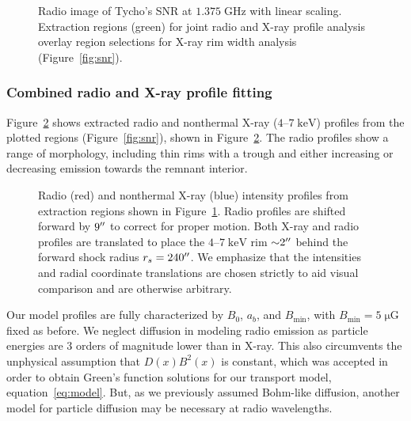 \documentclass[iop, apj, numberedappendix]{emulateapj}
\newcommand*{\mt}{\mathrm}
\newcommand*{\unit}[1]{\;\mt{#1}}  %
\newcommand*{\abt}{\mathord{\sim}} %
\newcommand*{\muG}{\unit{\mu G}}
\begin{document}
\begin{figure}
    \centering
    \caption{Radio image of Tycho's SNR at $1.375 \unit{GHz}$ with linear
    scaling.  Extraction regions (green) for joint radio and X-ray profile
    analysis overlay region selections for X-ray rim width analysis
    (Figure~\ref{fig:snr}). \label{fig:radio-snr}}
\end{figure}

\subsubsection{Combined radio and X-ray profile fitting}



Figure~\ref{fig:radio-prfs} shows extracted radio and nonthermal X-ray
($4$--$7\unit{keV}$) profiles from the plotted regions (Figure~\ref{fig:snr}),
shown in Figure~\ref{fig:radio-prfs}.  The radio profiles show a range of
morphology, including thin rims with a trough and either increasing or
decreasing emission towards the remnant interior.

\begin{figure}
    \centering
    \caption{Radio (red) and nonthermal X-ray (blue) intensity profiles from
    extraction regions shown in Figure~\ref{fig:radio-snr}.  Radio profiles are
    shifted forward by $9\mbox{$^{\prime\prime}$}$ to correct for proper motion.  Both X-ray and
    radio profiles are translated to place the $4$--$7 \unit{keV}$ rim $\abt
    2\arcsec$ behind the forward shock radius $r_s = 240\mbox{$^{\prime\prime}$}$.  We emphasize
    that the intensities and radial coordinate translations are chosen strictly
    to aid visual comparison and are otherwise arbitrary.
    \label{fig:radio-prfs}}
\end{figure}

Our model profiles are fully characterized by $B_0$, $a_b$, and $B_{\mt{min}}$,
with $B_{\mt{min}} = 5 \muG$ fixed as before.  We neglect diffusion in modeling
radio emission as particle energies are 3 orders of magnitude lower than in
X-ray.  This also circumvents the unphysical assumption that $D(x) B^2(x)$ is
constant, which was accepted in order to obtain Green's function solutions for
our transport model, equation~\eqref{eq:model}.  But, as we previously assumed
Bohm-like diffusion, another model for particle diffusion may be necessary at
radio wavelengths.
\end{document}

